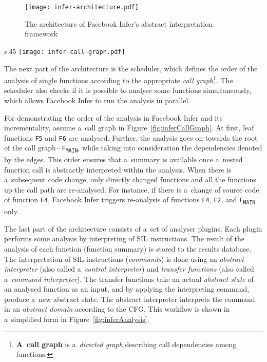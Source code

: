 \begin{figure}[hbt]
    \centering
    \texttt{[image: infer-architecture.pdf]}
    \caption{%
        The architecture of Facebook Infer's abstract interpretation
        framework~\cite{inferAISpeech, ppMarcin2018}
    }
    \label{fig:inferArch}
\end{figure}

\begin{wrapfigure}{r}{.45 \linewidth}
    \centering
    \vspace{-1em}
    \texttt{[image: infer-call-graph.pdf]}
    \caption{%
        A~call graph for an illustration of Facebook Infer's
        analysis process~\cite{inferAISpeech, excel2019FBInfer,
        ppMarcin2018}
    }
    \label{fig:inferCallGraph}
\end{wrapfigure}
The next part of the architecture is the scheduler, which defines the
order of the analysis of single functions according to the appropriate
\emph{call graph}\footnote{\textbf{A~call graph} is a~\emph{directed graph}
describing call dependencies among functions.}. The scheduler also checks
if it is possible to analyse some functions simultaneously, which allows
Facebook Infer to run the analysis in parallel.

\begin{example}
    For demonstrating the order of the analysis in Facebook Infer and its
    incrementality, assume a~call graph in Figure~\ref{fig:inferCallGraph}.
    At first, leaf functions \texttt{F5} and \texttt{F6} are analysed.
    Further, the analysis goes on towards the root of the call
    graph\,--\,\texttt{F\textsubscript{MAIN}}, while taking into
    consideration the dependencies denoted by the edges. This order ensures
    that a~summary is available once a~nested function call is abstractly
    interpreted within the analysis. When there is a~subsequent code change,
    only directly changed functions and all the functions up the call path
    are re-analysed. For instance, if there is a~change of source code of
    function \texttt{F4}, Facebook Infer triggers re-analysis of
    functions \texttt{F4}, \texttt{F2}, and \texttt{F\textsubscript{MAIN}}
    only.
\end{example}

The last part of the architecture consists of a~set of analyser plugins.
Each plugin performs some analysis by interpreting of SIL instructions.
The result of the analysis of each function (function summary) is stored to
the results database. The interpretation of SIL instructions (\emph{commands})
is done using an \emph{abstract interpreter} (also called a~\emph{control
interpreter}) and \emph{transfer functions} (also called a~\emph{command
interpreter}). The transfer functions take an actual \emph{abstract state}
of an analysed function as an input, and by applying the interpreting command,
produce a~new abstract state. The abstract interpreter interprets the
command in an \emph{abstract domain} according to the CFG. This workflow is
shown in a~simplified form in Figure~\ref{fig:inferAnalysis}.

